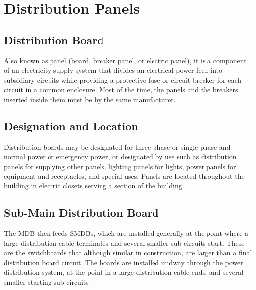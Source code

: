 \documentclass[12pt,fleqn]{book} %
\begin{document}
\chapter{Distribution Panels}

\section {Distribution Board}
Also known as panel (board, breaker panel, or electric panel), it is a component of an electricity supply system that divides an electrical power feed into subsidiary circuits while providing a protective fuse or circuit breaker for each circuit in a common enclosure. Most of the time, the panels and the breakers inserted inside them must be by the same manufacturer.

\section {Designation and Location}
Distribution boards may be designated for three-phase or single-phase and normal power or emergency power, or designated by use such as distribution panels for supplying other panels, lighting panels for lights, power panels for equipment and receptacles, and special uses. Panels are located throughout the building in electric closets serving a section of the building.
\section {Sub-Main Distribution Board}
The MDB then feeds SMDBs, which are installed generally at the point where a large distribution cable terminates and several smaller sub-circuits start. These are the switchboards that although similar in construction, are larger than a final distribution board circuit. The boards are installed midway through the power distribution system, at the point in a large distribution cable ends, and several smaller starting sub-circuits
\end{document}

